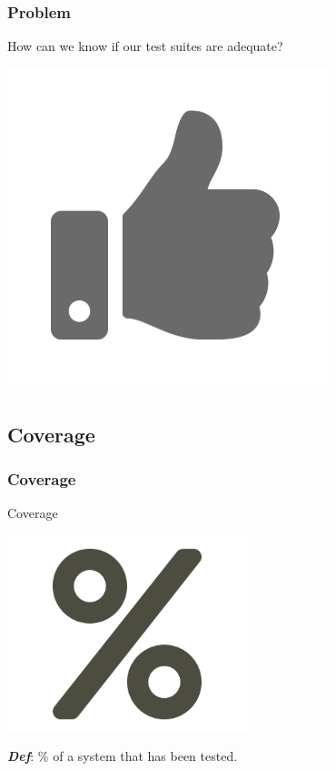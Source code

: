 \begin{frame}
	\frametitle{Problem}
	\begin{center}
		\huge{How can we know if our test suites are adequate?}

		\includegraphics[scale = .25]{images/thumb}
	\end{center}
\end{frame}

\subsection{Coverage}
\begin{frame}
	\frametitle{Coverage}
		\begin{center}
			\huge{Coverage}

			\includegraphics[scale = 0.25]{images/percent.png}

			\textbf{\textit{Def}}: \% of a system that has been tested.
		\end{center}




\end{frame}

